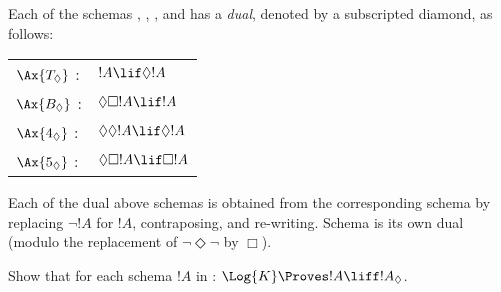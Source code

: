 \documentclass[../../../include/open-logic-section]{subfiles}
\begin{document}


\begin{defn}
  Each of the schemas , , , and
   has a \emph{dual}, denoted by a subscripted diamond, as
  follows:

  \begin{tabular}{p{1cm}l}%
    $\Ax{T_\Diamond}$ : & $!A \lif \Diamond!A$\\
    $\Ax{B_\Diamond}$ : & $\Diamond\Box!A \lif !A$\\
    $\Ax{4_\Diamond}$ : & $\Diamond\Diamond!A \lif \Diamond!A$\\
    $\Ax{5_\Diamond}$ : & $\Diamond\Box!A \lif \Box!A$
    \end{tabular}
\end{defn}

Each of the dual above schemas is obtained from the corresponding
schema by replacing $\lnot !A$ for $!A$, contraposing, and
re-writing. Schema  is its own dual (modulo the replacement
of $\lnot \Diamond \lnot$ by $\Box$). 

\begin{prob}
  Show that for each schema $!A$ in :
  $\Log{K} \Proves !A \liff !A_\Diamond$.
\end{prob}
\end{document}
